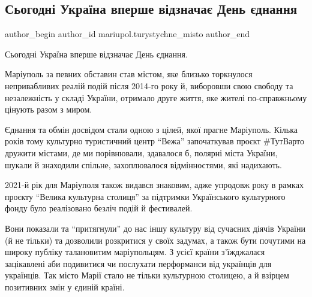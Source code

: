  
 
 
 
 

\subsection{Сьогодні Україна вперше відзначає День єднання}
\label{sec:16_02_2022.fb.mariupol.turystychne_misto.1.sjogodni_ukraina_vpershe_den_jednannja}

\ifcmt
 author_begin
   author_id mariupol.turystychne_misto
 author_end
\fi

Сьогодні Україна вперше відзначає День єднання.

Маріуполь за певних обставин став містом, яке близько торкнулося непривабливих
реалій подій після 2014-го року й, виборовши свою свободу та незалежність у
складі України, отримало друге життя, яке жителі по-справжньому цінують разом з
миром.

Єднання та обмін досвідом стали одною з цілей, якої прагне Маріуполь. Кілька
років тому культурно туристичний центр \enquote{Вежа} започаткував проєкт \#ТутВарто
дружити містами, де ми порівнювали, здавалося б, полярні міста України, шукали
й знаходили спільне, захоплювалося відмінностями, які надихають.

2021-й рік для Маріуполя також видався знаковим, адже упродовж року в рамках
проєкту \enquote{Велика культурна столиця} за підтримки Українського культурного фонду
було реалізовано безліч подій й фестивалей. 

Вони показали та \enquote{притягнули} до нас іншу культуру від сучасних діячів України
(й не тільки) та дозволили розкритися у своїх задумах, а також бути почутими на
широку публіку талановитим маріупольцям. З усієї країни з'їжджалася зацікавлені
аби подивитися чи послухати перформанси від українців для українців. Так місто
Марії стало не тільки культурною столицею, а й взірцем позитивних змін у єдиній
країні.

